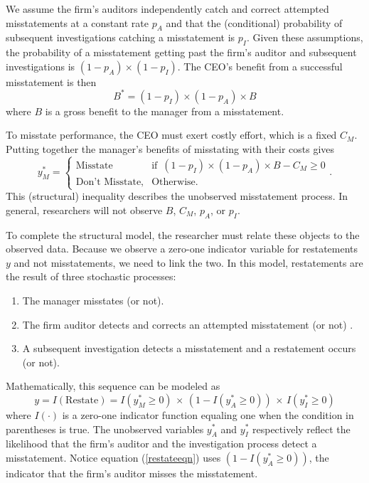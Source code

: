 We assume the firm's auditors independently catch and correct attempted misstatements at a constant rate $p_A$ and that the (conditional) probability of subsequent investigations catching a misstatement is $p_I$.
Given these assumptions, the probability of a misstatement getting past the firm's  auditor and subsequent investigations is $(1-p_A) \times (1 - p_I)$.
The CEO's benefit from a successful misstatement is then
$$ B^* = (1-p_I) \times (1-p_A) \times B$$
where $B$ is a gross benefit to the manager from a misstatement. 

To misstate performance, the CEO must exert costly effort, which is a fixed $C_M$. 
Putting together the manager's benefits of misstating with their costs gives
\begin{equation}\label{bencost}
		y_M^* = 
		  \begin{cases}
				\mbox{Misstate} & \mbox{if }\, (1-p_I) \times (1-p_A) \times B - C_M \ge 0\\
				\mbox{Don't Misstate,} & \mbox{Otherwise}.
		  \end{cases}.
\end{equation}
This (structural) inequality describes the unobserved misstatement process. 
In general, researchers will not observe $B$, $C_M$, $p_A$, or $p_I$.

To complete the structural model, the researcher must relate these objects to the observed data.
Because we observe a zero-one indicator variable for restatements $y$ and not misstatements, we need to link the two. 
In this model, restatements are the result of three stochastic processes:
\begin{enumerate}
\item The manager misstates (or not).
\item The firm auditor detects and corrects an attempted misstatement (or not) .
\item A subsequent investigation detects a misstatement and a restatement occurs (or not).
\end{enumerate}

Mathematically, this sequence can be modeled as
\begin{equation}\label{restateeqn}
 y = I(\mbox{Restate}) = I(y^*_M \ge 0) \, \times\, (1 - I(y^*_A \ge 0)) \, \times\, I(y^*_I \ge 0)
\end{equation}
where $I(\cdot)$ is a zero-one indicator function equaling one when the condition in parentheses is true.
The unobserved variables $y^*_A$ and $y^*_I$ respectively reflect the likelihood that the firm's
auditor and the investigation process detect a misstatement. Notice equation (\ref{restateeqn})
uses $(1 - I(y^*_A \ge 0))$, the indicator that the firm's auditor misses the misstatement.

